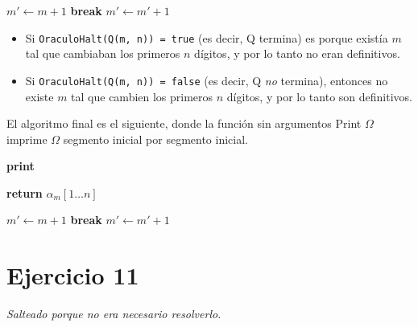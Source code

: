 \documentclass{article}
\theoremstyle{definition} %
\newcommand{\firstn}[1]{\first{n}{#1}}
\newcommand{\first}[2]{#2[1 \dots #1]}
\begin{document}
\begin{algorithmic}
        \State $m' \gets m + 1$
            \If{$\firstn{\alpha_m} \neq \firstn{\alpha_m'}$}
            \State \textbf{break}
            \EndIf
            \State $m' \gets m' + 1$
        \EndWhile
    \EndFunction
\end{algorithmic}

\begin{itemize}
    \item Si \texttt{OraculoHalt(Q(m, n)) = true} (es decir, Q termina) es
    porque existía $m$ tal que cambiaban los primeros $n$ dígitos, y por lo
    tanto no eran definitivos.

    \item Si \texttt{OraculoHalt(Q(m, n)) = false} (es decir, Q \textit{no}
    termina), entonces no existe $m$ tal que cambien los primeros $n$ dígitos, y
    por lo tanto son definitivos.
\end{itemize}

El algoritmo final es el siguiente, donde la función sin argumentos Print
$\Omega$ imprime $\Omega$ segmento inicial por segmento inicial.

\begin{algorithmic}

            \State \textbf{print} 
        \EndFor

    \EndFunction


            \State \textbf{return} $\firstn{\alpha_m}$
        \EndIf
    \EndFor

\EndFunction

        \State $m' \gets m + 1$
            \If{$\firstn{\alpha_m} \neq \firstn{\alpha_m'}$}
            \State \textbf{break}
            \EndIf
            \State $m' \gets m' + 1$
        \EndWhile
    \EndFunction
\end{algorithmic}

\newpage

\section*{Ejercicio 11}

\textit{Salteado porque no era necesario resolverlo.}
\end{document}
